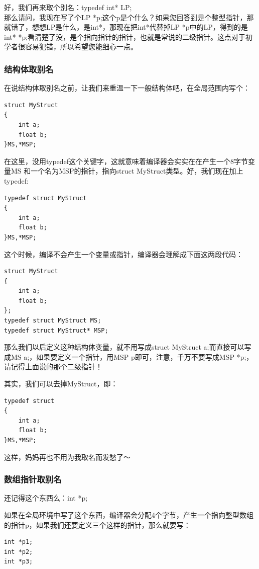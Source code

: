\documentclass[11pt,twoside,a4paper,titlepage]{article}	%
\begin{document}
好，我们再来取个别名：{\color{blue}typedef} {\color{violet}int*} LP;\\
那么请问，我现在写了个LP *p;这个p是个什么？如果您回答到是个整型指针，那就错了，想想LP是什么，是{\color{violet}int*}，那现在把{\color{violet}int*}代替掉LP *p中的LP，得到的是{\color{violet}int*} *p;看清楚了没，是个指向指针的指针，也就是常说的二级指针。这点对于初学者很容易犯错，所以希望您能细心一点。

\subsubsection{结构体取别名}
在说结构体取别名之前，让我们来重温一下一般结构体吧，在全局范围内写个：
\begin{lstlisting}
struct MyStruct
{
	int a;
	float b;
}MS,*MSP;
\end{lstlisting}

在这里，没用typedef这个关键字，这就意味着编译器会实实在在产生一个8字节变量MS 和一个名为MSP的指针，指向struct MyStruct类型。好，我们现在加上typedef:
\begin{lstlisting}
typedef struct MyStruct
{
	int a;
	float b;
}MS,*MSP;
\end{lstlisting}

这个时候，编译不会产生一个变量或指针，编译器会理解成下面这两段代码：

\begin{lstlisting}
struct MyStruct
{
	int a;
	float b;
};
typedef struct MyStruct MS;
typedef struct MyStruct* MSP;
\end{lstlisting}

那么我们以后定义这种结构体变量，就不用写成struct MyStruct a;而直接可以写成MS a;，如果要定义一个指针，用MSP p即可，注意，千万不要写成MSP *p;，请记得上面说的那个二级指针！

其实，我们可以去掉MyStruct，即：
\begin{lstlisting}
typedef struct
{
	int a;
	float b;
}MS,*MSP;
\end{lstlisting}

这样，妈妈再也不用为我取名而发愁了～

\subsubsection{数组指针取别名}

还记得这个东西么：int *p;

如果在全局环境中写了这个东西，编译器会分配4个字节，产生一个指向整型数组的指针p，如果我们还要定义三个这样的指针，那么就要写：
\begin{lstlisting}
int *p1;
int *p2;
int *p3;
\end{lstlisting}
\end{document}
